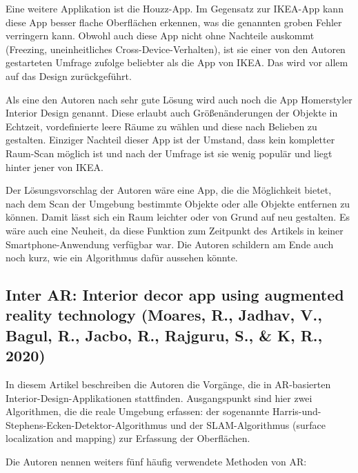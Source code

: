 \documentclass[12pt,paper=a4,oneside,hidelinks,headings=small,captions=heading,captions=nooneline]{scrartcl}
\begin{document}
Eine weitere Applikation ist die Houzz-App. Im Gegensatz zur IKEA-App
 kann diese App besser flache Oberflächen erkennen, was die genannten
 groben Fehler verringern kann. Obwohl auch diese App nicht ohne
 Nachteile auskommt (Freezing, uneinheitliches
 Cross-Device-Verhalten), ist sie einer von den Autoren gestarteten
 Umfrage zufolge beliebter als die App von IKEA. Das wird vor allem
 auf das Design zurückgeführt.

Als eine den Autoren nach sehr gute Lösung wird auch noch die App
Homerstyler Interior Design genannt. Diese erlaubt auch
Größenänderungen der Objekte in Echtzeit, vordefinierte leere Räume
zu wählen und diese nach Belieben zu gestalten. Einziger Nachteil
dieser App ist der Umstand, dass kein kompletter Raum-Scan möglich
ist und nach der Umfrage ist sie wenig populär und liegt hinter
jener von IKEA.

Der Lösungsvorschlag der Autoren wäre eine App, die die Möglichkeit
bietet, nach dem Scan der Umgebung bestimmte Objekte oder alle Objekte
entfernen zu können. Damit lässt sich ein Raum leichter oder von Grund
auf neu gestalten. Es wäre auch eine Neuheit, da diese Funktion zum
Zeitpunkt des Artikels in keiner Smartphone-Anwendung verfügbar
war. Die Autoren schildern am Ende auch noch kurz, wie ein Algorithmus dafür
aussehen könnte.

\subsection{Inter AR: Interior decor app using augmented reality technology (Moares, R., Jadhav, V., Bagul, R., Jacbo, R., Rajguru, S., \& K, R., 2020)}
\label{sec:org01baab4}

In diesem Artikel beschreiben die Autoren die Vorgänge, die in
AR-basierten Interior-Design-Applikationen stattfinden. Ausgangspunkt
sind hier zwei Algorithmen, die die reale Umgebung erfassen: der
sogenannte Harris-und-Stephens-Ecken-Detektor-Algorithmus und der
SLAM-Algorithmus (surface localization and mapping) zur Erfassung der
Oberflächen.

Die Autoren nennen weiters fünf häufig verwendete Methoden von AR:
\end{document}
